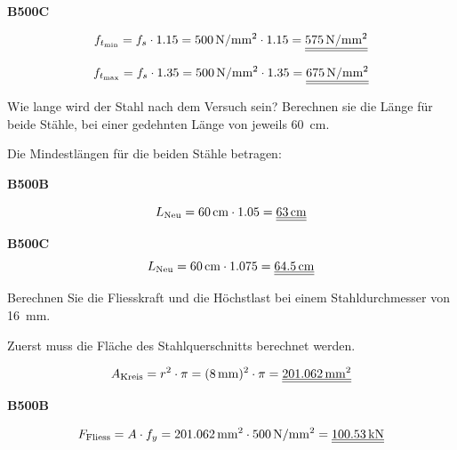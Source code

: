 \begin{questions}
\begin{solution}
        \textbf{B500C}

        \begin{equation*}
            f_{t_\text{min}} = f_s \cdot 1.15 = \myNmm{500} \cdot 1.15 = \FinRes{\myNmm{575}}
        \end{equation*}


        \begin{equation*}
            f_{t_\text{max}} = f_s \cdot 1.35 = \myNmm{500} \cdot 1.35 = \FinRes{\myNmm{675}}
        \end{equation*}

    \end{solution}

    \question
    Wie lange wird der Stahl nach dem Versuch sein? Berechnen sie die Länge für beide Stähle, bei einer gedehnten Länge von jeweils \SI{60}{\cm}.


    \begin{solution}
        Die Mindestlängen für die beiden Stähle betragen:

        \textbf{B500B}

        \begin{equation*}
            L_{\text{Neu}} = \SI{60}{\cm} \cdot 1.05 = \FinRes{\SI{63}{\cm}}
        \end{equation*}

        \textbf{B500C}
        \begin{equation*}
            L_{\text{Neu}} = \SI{60}{\cm} \cdot 1.075 = \FinRes{\SI{64.5}{\cm}}
        \end{equation*}
    \end{solution}

    \question
    Berechnen Sie die Fliesskraft und die Höchstlast bei einem Stahldurchmesser von \SI{16}{\mm}.

    \begin{solution}
        Zuerst muss die Fläche des Stahlquerschnitts berechnet werden.

        \begin{equation*}
            A_{\text{Kreis}} = r^2 \cdot \pi = (\SI{8}{\mm})^2 \cdot \pi = \FinRes{\SI{201.062}{\mm^2}}
        \end{equation*}

        \textbf{B500B}

        \begin{equation*}
            F_{\text{Fliess}} = A \cdot f_y = \SI{201.062}{\mm^2} \cdot \myNmm{500} = \FinRes{\SI{100.53}{\kilo\N}}
        \end{equation*}


\end{solution}
\end{questions}
